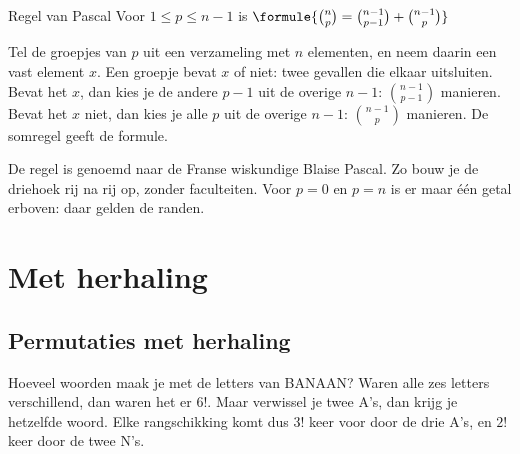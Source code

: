 \begin{theorie}
\begin{stelling}{Regel van Pascal}
Voor $1 \leqslant p \leqslant n - 1$ is \quad $\formule{\binom{n}{p} = \binom{n - 1}{p - 1} + \binom{n - 1}{p}}$
\end{stelling}

\begin{bewijs}
Tel de groepjes van $p$ uit een verzameling met $n$ elementen, en neem daarin een vast element $x$. Een groepje bevat $x$ of niet: twee gevallen die elkaar uitsluiten. Bevat het $x$, dan kies je de andere $p - 1$ uit de overige $n - 1$: $\binom{n - 1}{p - 1}$ manieren. Bevat het $x$ niet, dan kies je alle $p$ uit de overige $n - 1$: $\binom{n - 1}{p}$ manieren. De somregel geeft de formule.
\end{bewijs}
\end{theorie}

De regel is genoemd naar de Franse wiskundige Blaise Pascal. Zo bouw je de driehoek rij na rij op, zonder faculteiten. Voor $p = 0$ en $p = n$ is er maar één getal erboven: daar gelden de randen.


\begin{oefeningen}

\end{oefeningen}

\section{Met herhaling}

\subsection{Permutaties met herhaling}

Hoeveel woorden maak je met de letters van BANAAN? Waren alle zes letters verschillend, dan waren het er $6!$. Maar verwissel je twee A's, dan krijg je hetzelfde woord. Elke rangschikking komt dus $3!$ keer voor door de drie A's, en $2!$ keer door de twee N's.

